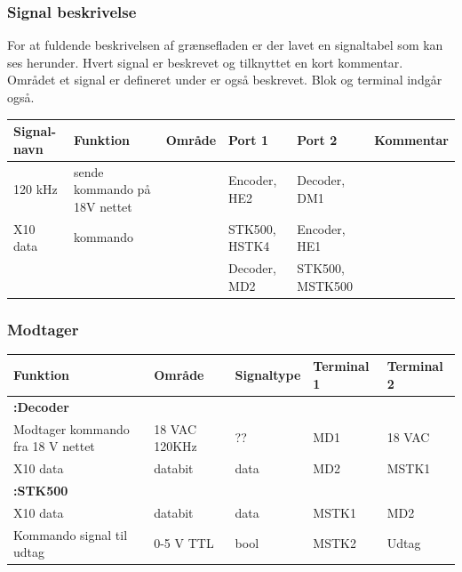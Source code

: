 \begin{table}[htbp]
\subsubsection{Signal beskrivelse}
For at fuldende beskrivelsen af grænsefladen er der lavet en signaltabel som kan ses herunder. Hvert signal er beskrevet og tilknyttet en kort kommentar. Området et signal er defineret under er også beskrevet. Blok og terminal indgår også. 

\begin{tabular}{|p{2cm}|p{2cm}|p{2cm}|p{2cm}|p{2cm}|p{}|}
\hline
\textbf{Signal-navn} & \textbf{Funktion} & \textbf{Område} & \textbf{Port 1} & \textbf{Port 2} & \textbf{Kommentar} \\ \hline

120 kHz & sende kommando på 18V nettet & & Encoder, HE2 & Decoder, DM1 & \\ \hline

X10 data & kommando & & STK500, HSTK4 & Encoder, HE1 & \\
&&& Decoder, MD2 & STK500, MSTK500 &\\ \hline
\end{tabular}
\end{table}

\begin{table}[htbp]
\subsubsection{Modtager}
\begin{tabular}{|p{3cm}|p{}|p{}|p{}|p{}|}
\hline 
\textbf{Funktion} &\textbf{Område} &\textbf{Signaltype} &\textbf{Terminal 1} &\textbf{Terminal 2} \\ 
\hline 
\multicolumn{5}{|l|}{\textbf{:Decoder}} \\ 
\hline 
Modtager kommando fra 18 V nettet &18 VAC \newline 120KHz &?? &MD1 &18 VAC\\ 
\hline 
X10 data &databit &data &MD2 &MSTK1\\ 
\hline 
\multicolumn{5}{|l|}{\textbf{:STK500}} \\ 
\hline 
X10 data &databit &data &MSTK1 &MD2\\ 
\hline 
Kommando signal til udtag  &0-5 V TTL &bool &MSTK2 &Udtag\\ 
\hline 
\end{tabular}
\end{table}